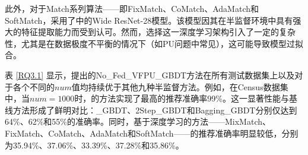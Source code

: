 此外，对于Match系列算法——即FixMatch、CoMatch、AdaMatch和SoftMatch，采用了\citep{oliver2018realistic}中的Wide ResNet-28模型。该模型因其在半监督环境中具有强大的特征提取能力而受到认可。然而，选择这一深度学习架构引入了一定的复杂性，尤其是在数据极度不平衡的情况下（如PU问题中常见），这可能导致模型过拟合。

表 \ref{RQ3.1} 显示，提出的No\_Fed\_VFPU\_GBDT方法在所有测试数据集上以及对于各个不同的$num$值均持续优于其他九种半监督方法。例如，在Census数据集中，当$num=1000$时，的方法实现了最高的推荐准确率99\%。这一显著性能与基线方法形成了鲜明对比：\_GBDT、2Step\_GBDT和Bagging\_GBDT分别仅达到64\%、62\%和55\%的准确率。同时，基于深度学习的方法——MixMatch、FixMatch、CoMatch、AdaMatch和SoftMatch——的推荐准确率明显较低，分别为35.94\%、37.06\%、33.39\%、37.28\%和35.86\%。

\vspace{0.1cm}
